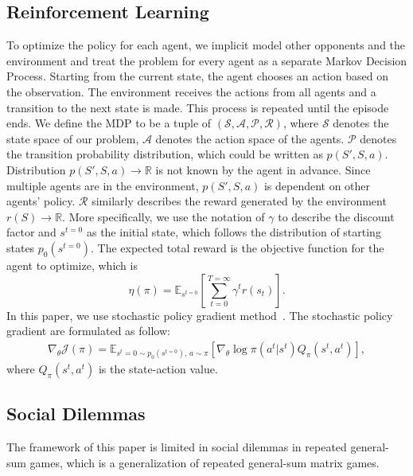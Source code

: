 \documentclass{article}
\begin{document}
\subsection{Reinforcement Learning}
To optimize the policy for each agent, we implicit model other opponents and the environment
and treat the problem for every agent as a separate Markov Decision Process.
Starting from the current state, the agent chooses an action based on the observation.
The environment receives the actions from all agents and a transition to the next state is made.
This process is repeated until the episode ends.
We define the MDP to be a tuple of
\((\mathcal{S}, \mathcal{A}, \mathcal{P}, \mathcal{R})\),
where \(\mathcal{S}\) denotes the state space of our problem,
\(\mathcal{A}\) denotes the action space of the agents.
\(\mathcal{P}\) denotes the transition probability distribution,
which could be written as \(p(S', S, a)\).
Distribution \(p(S', S, a) \rightarrow \mathbb{R}\) is not known by the agent in advance.
Since multiple agents are in the environment, \(p(S', S, a)\) is dependent on other agents' policy.
\(\mathcal{R}\) similarly describes the reward generated by the environment
\(r(S) \rightarrow \mathbb{R}\).
More specifically, we use the notation of \(\gamma\) to describe the discount factor and
\(s^{t=0}\) as the initial state, which follows the distribution of starting states \(p_0(s^{t=0})\).
The expected total reward is the objective function for the agent to optimize, which is
\begin{equation}\label{equation:objective}
    \eta(\pi) = \mathbb{E}_{s^{t=0}}\left[\sum_{t=0}^{T=\infty}\gamma^t r(s_t)\right].
\end{equation}
In this paper,
we use stochastic policy gradient method~\cite{sutton2000}.
The stochastic policy gradient are formulated as follow:
\begin{equation}\label{spg}
\begin{aligned}
 \nabla_\theta\mathcal{J}(\pi) =
    \mathbb{E}_{s^t=0\sim p_0(s^{t=0}),\,a\sim\pi} \left[\nabla_\theta\log\pi(a^t|s^t) Q_\pi(s^t, a^t)\right],
    \end{aligned}
\end{equation}
where \(Q_\pi(s^t, a^t)\) is the state-action value.
\subsection{Social Dilemmas}
The framework of this paper is limited in social dilemmas in repeated general-sum games,
which is a generalization of repeated general-sum matrix games.
\end{document}
